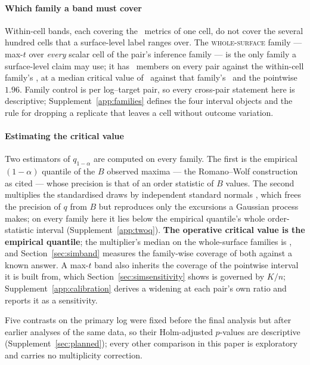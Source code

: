 \documentclass[11pt,3p,review,authoryear]{elsarticle}
\theoremstyle{definition}
\begin{document}
\paragraph{Which family a band must cover}
Within-cell bands, each covering the \nInstruments\ metrics of one cell, do
not cover the several hundred cells that a surface-level label ranges over.
The \textsc{whole-surface} family --- max-$t$ over \emph{every} scalar cell
of the pair's inference family --- is the only family a surface-level claim
may use; it has \familySizeMedian\ members on every pair against the within-cell
family's \nInstruments, at a median critical value of \maxTSurfaceMedian\
against that family's \maxTWithinMedian\ and the pointwise $1.96$. Family
control is per log--target pair, so every cross-pair statement here is
descriptive; Supplement~\ref{app:families} defines the four interval objects
and the rule for dropping a replicate that leaves a cell without outcome
variation.

\paragraph{Estimating the critical value}
Two estimators of $q_{1-\alpha}$ are computed on every family. The first is
the empirical $(1-\alpha)$ quantile of the $B$ observed maxima --- the
Romano--Wolf construction as cited --- whose precision is that of an order
statistic of $B$ values. The second multiplies the standardised draws by
independent standard normals \citep{chernozhukov2013gaussian}, which frees
the precision of $q$ from $B$ but reproduces only the excursions a Gaussian
process makes; on every family here it lies below the empirical quantile's
whole order-statistic interval (Supplement~\ref{app:twoq}). \textbf{The
operative critical value is the empirical quantile}; the multiplier's median
on the whole-surface families is \maxTSurfaceMultMedian, and
Section~\ref{sec:simband} measures the family-wise coverage of both against a
known answer. A max-$t$ band also inherits the coverage of the pointwise
interval it is built from, which Section~\ref{sec:simsensitivity} shows is
governed by $K/n$; Supplement~\ref{app:calibration} derives a widening at
each pair's own ratio and reports it as a sensitivity.

Five contrasts on the primary log were fixed before the final analysis but
after earlier analyses of the same data, so their Holm-adjusted $p$-values
are descriptive (Supplement~\ref{sec:planned}); every other comparison in
this paper is exploratory and carries no multiplicity correction.
\end{document}
